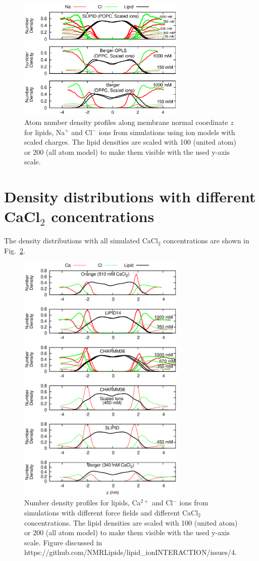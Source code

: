 \documentclass[pre,aps,floatfix,authordate1-4,twocolumn]{revtex4-1}
\begin{document}
\begin{figure}[]
  \centering
  \includegraphics[width=8cm]{../Fig/NAdensitiesSCALED.eps} 
  \caption{\label{NAdensitySCALED}
    Atom number density profiles along membrane normal coordinate $z$ for lipids, Na$^+$ and Cl$^-$ ions from simulations using
    ion models with scaled charges. The lipid densities are scaled with 100 (united atom) or 200 (all atom model) to make them visible with the used y-axis scale.
}
\end{figure}


\section{Density distributions with different CaCl$_2$ concentrations}

The density distributions with all simulated CaCl$_2$ concentrations are shown in Fig.~\ref{CAdensities}.
\begin{figure}[]
  \centering
  \includegraphics[width=8cm]{../Fig/CAdensities.eps}
  \caption{\label{CAdensities}
    Number density profiles for lipids, Ca$^{2+}$ and Cl$^-$ ions from simulations with different force fields 
    and different CaCl$_2$ concentrations. 
    The lipid densities are scaled with 100 (united atom) or 200 (all atom model) to make them visible with the used y-axis scale.
    Figure discussed in https://github.com/NMRLipids/lipid\_ionINTERACTION/issues/4.
  }
\end{figure}
\end{document}
